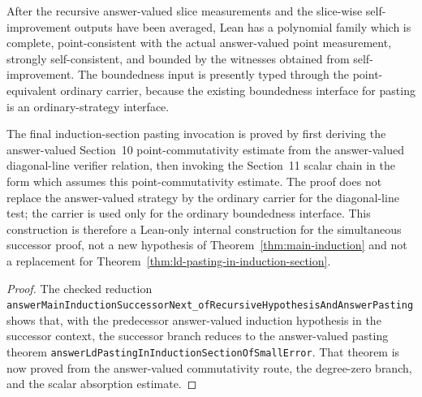 \begin{proposition}\label{prop:main-induction-successor-answer-valued-pasting}
	\leanok
	After the recursive answer-valued slice measurements and the slice-wise
	self-improvement outputs have been averaged, Lean has a polynomial family
	which is complete, point-consistent with the actual answer-valued point
	measurement, strongly self-consistent, and bounded by the witnesses obtained
	from self-improvement.  The boundedness input is presently typed through the
	point-equivalent ordinary carrier, because the existing boundedness interface
	for pasting is an ordinary-strategy interface.

	The final induction-section pasting invocation is proved by first deriving
	the answer-valued Section~10 point-commutativity estimate from the
	answer-valued diagonal-line verifier relation, then invoking the Section~11
	scalar chain in the form which assumes this point-commutativity estimate.
	The proof does not replace the answer-valued strategy by the ordinary carrier
	for the diagonal-line test; the carrier is used only for the ordinary
	boundedness interface.  This construction is therefore a Lean-only internal
	construction for the simultaneous successor proof, not a new hypothesis of
	Theorem~\ref{thm:main-induction} and not a replacement for
	Theorem~\ref{thm:ld-pasting-in-induction-section}.
\end{proposition}
\begin{proof}
	\leanok
	The checked reduction
	\texttt{answerMainInductionSuccessorNext\_ofRecursiveHypothesisAndAnswerPasting}
	shows that, with the predecessor answer-valued induction hypothesis in the
	successor context, the successor branch reduces to the answer-valued pasting
	theorem
	\texttt{answerLdPastingInInductionSectionOfSmallError}.  That theorem is now
	proved from the answer-valued commutativity route, the degree-zero branch, and
	the scalar absorption estimate.
\end{proof}

